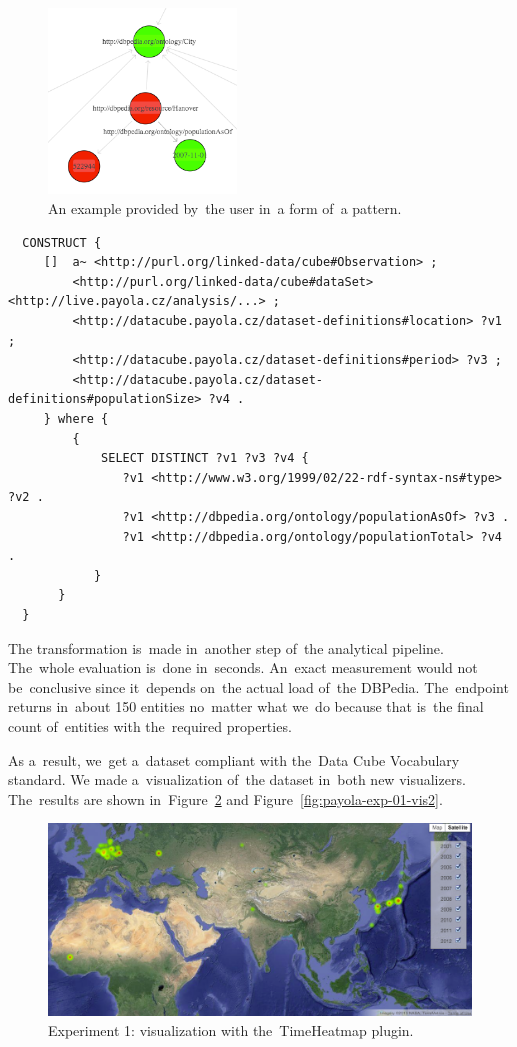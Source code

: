 \begin{figure}
  \centering
  \includegraphics[width=50mm]{img/payola-exp-01-selection.png}
  \caption{An example provided by~the user in~a form of~a pattern.}
  \label{fig:payola-exp-01-selection}
\end{figure}

\scriptsize
\begin{verbatim}
  CONSTRUCT {
     []  a~ <http://purl.org/linked-data/cube#Observation> ;
         <http://purl.org/linked-data/cube#dataSet> <http://live.payola.cz/analysis/...> ;
         <http://datacube.payola.cz/dataset-definitions#location> ?v1 ;
         <http://datacube.payola.cz/dataset-definitions#period> ?v3 ;
         <http://datacube.payola.cz/dataset-definitions#populationSize> ?v4 .
     } where {
         {
             SELECT DISTINCT ?v1 ?v3 ?v4 {
                ?v1 <http://www.w3.org/1999/02/22-rdf-syntax-ns#type> ?v2 .
                ?v1 <http://dbpedia.org/ontology/populationAsOf> ?v3 .
                ?v1 <http://dbpedia.org/ontology/populationTotal> ?v4 .
            }
       }
  } 
\end{verbatim}
\normalsize

The transformation is~made in~another step of~the analytical pipeline. The~whole evaluation is~done in~seconds. An~exact measurement would not be~conclusive since it~depends on~the actual load of~the DBPedia. The~endpoint 
returns in~about 150 entities no~matter what we~do because that is~the final
count of~entities with the~required properties.

As a~result, we~get a~dataset compliant with the~Data Cube Vocabulary standard. 
We made a~visualization of~the dataset in~both new visualizers. The~results are 
shown in~Figure~\ref{fig:payola-exp-01-vis} and Figure~\ref{fig:payola-exp-01-vis2}.

\begin{figure}
  \centering
  \includegraphics[width=140mm]{img/payola-exp-01-vis.png}
  \caption{Experiment 1: visualization with the~TimeHeatmap plugin.}
  \label{fig:payola-exp-01-vis}
\end{figure}

